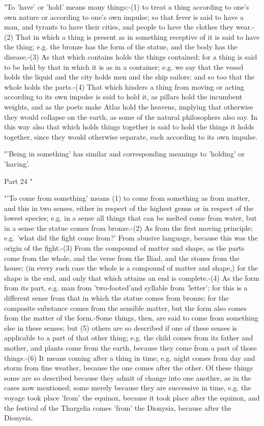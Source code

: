 "To 'have' or 'hold' means many things:-(1) to treat a thing according
to one's own nature or according to one's own impulse; so that fever
is said to have a man, and tyrants to have their cities, and people
to have the clothes they wear.-(2) That in which a thing is present
as in something receptive of it is said to have the thing; e.g. the
bronze has the form of the statue, and the body has the disease.-(3)
As that which contains holds the things contained; for a thing is
said to be held by that in which it is as in a container; e.g. we
say that the vessel holds the liquid and the city holds men and the
ship sailors; and so too that the whole holds the parts.-(4) That
which hinders a thing from moving or acting according to its own impulse
is said to hold it, as pillars hold the incumbent weights, and as
the poets make Atlas hold the heavens, implying that otherwise they
would collapse on the earth, as some of the natural philosophers also
say. In this way also that which holds things together is said to
hold the things it holds together, since they would otherwise separate,
each according to its own impulse. 

"'Being in something' has similar and corresponding meanings to 'holding'
or 'having'. 

Part 24 "

"'To come from something' means (1) to come from something as from
matter, and this in two senses, either in respect of the highest genus
or in respect of the lowest species; e.g. in a sense all things that
can be melted come from water, but in a sense the statue comes from
bronze.-(2) As from the first moving principle; e.g. 'what did the
fight come from?' From abusive language, because this was the origin
of the fight.-(3) From the compound of matter and shape, as the parts
come from the whole, and the verse from the Iliad, and the stones
from the house; (in every such case the whole is a compound of matter
and shape,) for the shape is the end, and only that which attains
an end is complete.-(4) As the form from its part, e.g. man from 'two-footed'and
syllable from 'letter'; for this is a different sense from that in
which the statue comes from bronze; for the composite substance comes
from the sensible matter, but the form also comes from the matter
of the form.-Some things, then, are said to come from something else
in these senses; but (5) others are so described if one of these senses
is applicable to a part of that other thing; e.g. the child comes
from its father and mother, and plants come from the earth, because
they come from a part of those things.-(6) It means coming after a
thing in time, e.g. night comes from day and storm from fine weather,
because the one comes after the other. Of these things some are so
described because they admit of change into one another, as in the
cases now mentioned; some merely because they are successive in time,
e.g. the voyage took place 'from' the equinox, because it took place
after the equinox, and the festival of the Thargelia comes 'from'
the Dionysia, because after the Dionysia. 

